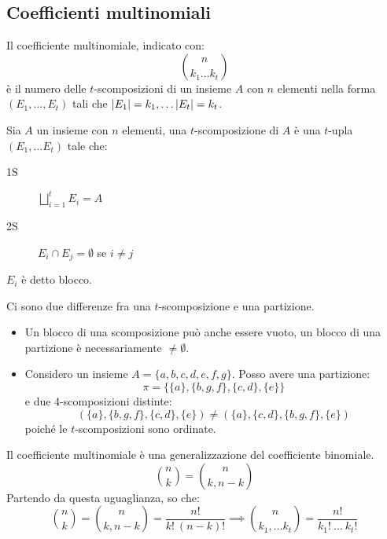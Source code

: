 \subsection{Coefficienti multinomiali}

Il coefficiente multinomiale, indicato con:
\[
\binom{n}{k_1 \dots k_t}
\]
\`e il numero delle $t$-scomposizioni di un insieme $A$ con $n$ elementi nella forma $(E_1, \dots, E_t)$ tali che $\left\lvert{E_1}\right\rvert = k_1, \dots \left\lvert{E_t}\right\rvert = k_t$.

\begin{defn}[$t$-scomposizioni]
Sia $A$ un insieme con $n$ elementi, una $t$-scomposizione di $A$ \`e una $t$-upla $(E_1, \dots E_t)$ tale che:
\begin{description}
  \item[1S] $\bigsqcup_{i = 1}^{t} E_i = A$
  \item[2S] $E_i \cap E_j = \emptyset$ se $i \neq j$ 
\end{description}
$E_i$ \`e detto blocco.
\end{defn}
Ci sono due differenze fra una $t$-scomposizione e una partizione.
\begin{itemize}
  \item Un blocco di una scomposizione pu\`o anche essere vuoto, un blocco di una partizione \`e necessariamente $\neq \emptyset$.
  \item Considero un insieme $A = \{ a, b, c, d, e, f, g\}$. Posso avere una partizione:
  \[
  \pi = \{ \{a\}, \{b, g, f\}, \{c, d\}, \{e\} \}
  \]
  e due 4-scomposizioni distinte:
  \[
  (\{a\}, \{b, g, f\}, \{c, d\}, \{e\}) \neq 
  (\{a\}, \{c, d\}, \{b, g, f\}, \{e\})
  \]
  poich\'e le $t$-scomposizioni sono ordinate.
\end{itemize} 

Il coefficiente multinomiale \`e una generalizzazione del coefficiente binomiale.
\[
\binom{n}{k} = \binom{n}{k, n-k}
\]
Partendo da questa uguaglianza, so che:
\[
\binom{n}{k} = \binom{n}{k, n-k} = \frac{n!}{k! \ (n - k)!}
\implies
\binom{n}{k_1, \dots k_t} = \frac{n!}{k_1! \ \dots \ k_t!}
\]

